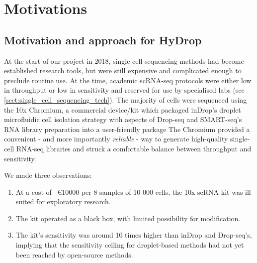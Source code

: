 \chapter{Motivations}
\section{Motivation and approach for HyDrop}
At the start of our project in 2018, single-cell sequencing methods had become established research tools, but were still expensive and complicated enough to preclude routine use. At the time, academic scRNA-seq protocols were either low in throughput or low in sensitivity and reserved for use by specialised labs (see \autoref{sect:single_cell_sequencing_tech}). The majority of cells were sequenced using the 10x Chromium, a commercial device/kit which packaged inDrop's droplet microfluidic cell isolation strategy with aspects of Drop-seq and SMART-seq's RNA library preparation into a user-friendly package The Chromium provided a convenient - and more importantly \textit{reliable} - way to generate high-quality single-cell RNA-seq libraries and struck a comfortable balance between throughput and sensitivity.

We made three observations:
\begin{enumerate}[noitemsep]
	\item At a cost of ~\euro{\num{10000}} per 8 samples of 10 000 cells, the 10x scRNA kit was ill-suited for exploratory research.
	\item The kit operated as a black box, with limited possibility for modification.
	\item The kit's sensitivity was around 10 times higher than inDrop and Drop-seq's, implying that the sensitivity ceiling for droplet-based methods had not yet been reached by open-source methods.
\end{enumerate}

